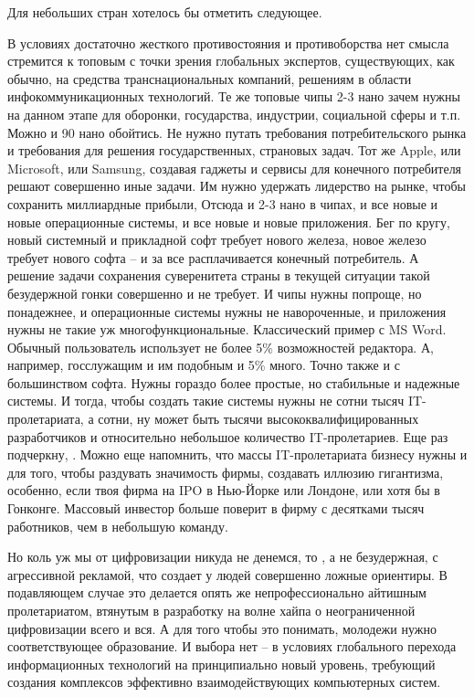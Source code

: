 \begin{partbacktext}
Для небольших стран хотелось бы отметить следующее.

В условиях достаточно жесткого противостояния и противоборства нет смысла стремится к топовым с точки зрения глобальных экспертов, существующих, как обычно, на средства транснациональных компаний, решениям в области инфокоммуникационных технологий. Те же топовые чипы 2-3 нано зачем нужны на данном этапе для оборонки, государства, индустрии, социальной сферы и т.п. Можно и 90 нано обойтись. Не нужно путать требования потребительского рынка и требования для решения государственных, страновых задач. Тот же Apple, или Microsoft, или Samsung, создавая гаджеты и сервисы для конечного потребителя решают совершенно иные задачи. Им нужно удержать лидерство на рынке, чтобы сохранить миллиардные прибыли, Отсюда и 2-3 нано в чипах, и все новые и новые операционные системы, и все новые и новые приложения. Бег по кругу, новый системный и прикладной софт требует нового железа, новое железо требует нового софта -- и за все расплачивается конечный потребитель. А решение задачи сохранения суверенитета страны в текущей ситуации такой безудержной гонки совершенно и не требует. И чипы нужны попроще, но понадежнее, и операционные системы нужны не навороченные, и приложения нужны не такие уж многофункциональные. Классический пример с MS Word. Обычный пользователь использует не более 5\% возможностей редактора. А, например, госслужащим и им подобным и 5\% много. Точно также и с большинством софта. Нужны гораздо более простые, но стабильные и надежные системы. И тогда, чтобы создать такие системы нужны не сотни тысяч IT-пролетариата, а сотни, ну может быть тысячи высококвалифицированных разработчиков и относительно небольшое количество IT-пролетариев. Еще раз подчеркну,   . Можно еще напомнить, что массы IT-пролетариата бизнесу нужны и для того, чтобы раздувать значимость фирмы, создавать иллюзию гигантизма, особенно, если твоя фирма на IPO в Нью-Йорке или Лондоне, или хотя бы в Гонконге. Массовый инвестор больше поверит в фирму с десятками тысяч работников, чем в небольшую команду.

Но коль уж мы от цифровизации никуда не денемся, то   , а не безудержная, с агрессивной рекламой, что создает у людей совершенно ложные ориентиры. В подавляющем случае это делается опять же непрофессионально айтишным пролетариатом, втянутым в разработку на волне хайпа о неограниченной цифровизации всего и вся. А для того чтобы это понимать, молодежи нужно соответствующее образование. И выбора нет --            в условиях глобального перехода информационных технологий на принципиально новый уровень, требующий создания комплексов эффективно взаимодействующих компьютерных систем.
 

\end{partbacktext}
